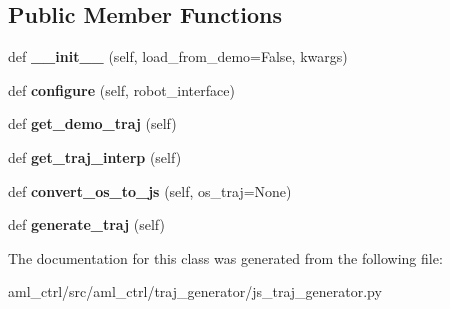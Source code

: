 \subsection*{Public Member Functions}
\begin{DoxyCompactItemize}
\item 
\hypertarget{classaml__ctrl_1_1traj__generator_1_1js__traj__generator_1_1_j_s_traj_generator_a8f3f80b67d5c1ca0821cd311764636ec}{}\label{classaml__ctrl_1_1traj__generator_1_1js__traj__generator_1_1_j_s_traj_generator_a8f3f80b67d5c1ca0821cd311764636ec} 
def {\bfseries \+\_\+\+\_\+init\+\_\+\+\_\+} (self, load\+\_\+from\+\_\+demo=False, kwargs)
\item 
\hypertarget{classaml__ctrl_1_1traj__generator_1_1js__traj__generator_1_1_j_s_traj_generator_a022b44a0ef727669bb5c5a12b6ed9b44}{}\label{classaml__ctrl_1_1traj__generator_1_1js__traj__generator_1_1_j_s_traj_generator_a022b44a0ef727669bb5c5a12b6ed9b44} 
def {\bfseries configure} (self, robot\+\_\+interface)
\item 
\hypertarget{classaml__ctrl_1_1traj__generator_1_1js__traj__generator_1_1_j_s_traj_generator_ad5f065b319964c3e6640c700eabf2361}{}\label{classaml__ctrl_1_1traj__generator_1_1js__traj__generator_1_1_j_s_traj_generator_ad5f065b319964c3e6640c700eabf2361} 
def {\bfseries get\+\_\+demo\+\_\+traj} (self)
\item 
\hypertarget{classaml__ctrl_1_1traj__generator_1_1js__traj__generator_1_1_j_s_traj_generator_a8844409ef5da594ac029efbb4c60f617}{}\label{classaml__ctrl_1_1traj__generator_1_1js__traj__generator_1_1_j_s_traj_generator_a8844409ef5da594ac029efbb4c60f617} 
def {\bfseries get\+\_\+traj\+\_\+interp} (self)
\item 
\hypertarget{classaml__ctrl_1_1traj__generator_1_1js__traj__generator_1_1_j_s_traj_generator_a8aeb635dc050800d6dad4a7f34d32f26}{}\label{classaml__ctrl_1_1traj__generator_1_1js__traj__generator_1_1_j_s_traj_generator_a8aeb635dc050800d6dad4a7f34d32f26} 
def {\bfseries convert\+\_\+os\+\_\+to\+\_\+js} (self, os\+\_\+traj=None)
\item 
\hypertarget{classaml__ctrl_1_1traj__generator_1_1js__traj__generator_1_1_j_s_traj_generator_a449ff9de50f0939e27a5ae11e9c4cfb0}{}\label{classaml__ctrl_1_1traj__generator_1_1js__traj__generator_1_1_j_s_traj_generator_a449ff9de50f0939e27a5ae11e9c4cfb0} 
def {\bfseries generate\+\_\+traj} (self)
\end{DoxyCompactItemize}


The documentation for this class was generated from the following file\+:\begin{DoxyCompactItemize}
\item 
aml\+\_\+ctrl/src/aml\+\_\+ctrl/traj\+\_\+generator/js\+\_\+traj\+\_\+generator.\+py\end{DoxyCompactItemize}
